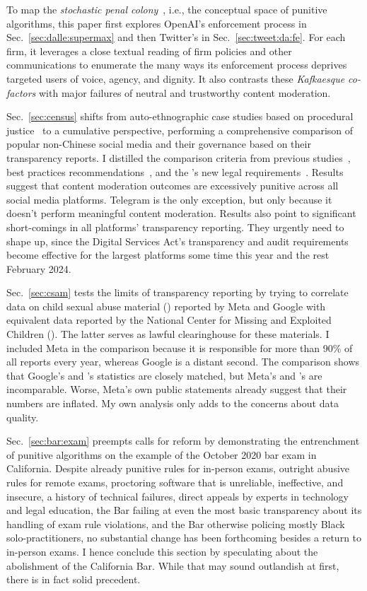 To map the \emph{stochastic penal colony}~, i.e., the
conceptual space of punitive algorithms, this paper first explores OpenAI's
enforcement process in Sec.\ \ref{sec:dalle:supermax} and then Twitter's in
Sec.\ \ref{sec:tweet:da:fe}. For each firm, it leverages a close textual reading
of firm policies and other communications to enumerate the many ways its
enforcement process deprives targeted users of voice, agency, and dignity. It
also contrasts these \emph{Kafkaesque co-factors} with major failures of neutral
and trustworthy content moderation.

Sec.\ \ref{sec:census} shifts from auto-ethnographic case studies based on
procedural justice~\cite{Tyler2003,Tyler2006,Tyler2007} to a cumulative
perspective, performing a comprehensive comparison of popular non-Chinese social
media and their governance based on their transparency reports. I distilled the
comparison criteria from previous
studies~\cite{BradfordGriselea2019,CrockerGebhartea2019}, best practices
recommendations~\cite{TheSantaClaraPrinciples2021}, and the \EU's new legal
requirements~\cite{EuropeanParliamentAndCouncil2022}. Results suggest that
content moderation outcomes are excessively punitive across all social media
platforms. Telegram is the only exception, but only because it doesn't perform
meaningful content moderation. Results also point to significant short-comings
in all platforms' transparency reporting. They urgently need to shape up, since
the Digital Services Act's transparency and audit requirements become effective
for the largest platforms some time this year and the rest February 2024.

Sec.\ \ref{sec:csam} tests the limits of transparency reporting by trying to
correlate data on child sexual abuse material (\CSAM) reported by Meta and
Google with equivalent data reported by the National Center for Missing and
Exploited Children (\NCMEC). The latter serves as lawful clearinghouse for these
materials. I included Meta in the comparison because it is responsible for more
than 90\% of all \CSAM{} reports every year, whereas Google is a distant second.
The comparison shows that Google's and \NCMEC's statistics are closely matched,
but Meta's and \NCMEC's are incomparable. Worse, Meta's own public statements
already suggest that their numbers are inflated. My own analysis only adds to
the concerns about data quality.

Sec.\ \ref{sec:bar:exam} preempts calls for reform by demonstrating the
entrenchment of punitive algorithms on the example of the October 2020 bar exam
in California. Despite already punitive rules for in-person exams, outright
abusive rules for remote exams, proctoring software that is unreliable,
ineffective, and insecure, a history of technical failures, direct appeals by
experts in technology and legal education, the Bar failing at even the most
basic transparency about its handling of exam rule violations, and the Bar
otherwise policing mostly Black solo-practitioners, no substantial change has
been forthcoming besides a return to in-person exams. I hence conclude this
section by speculating about the abolishment of the California Bar. While that
may sound outlandish at first, there is in fact solid precedent.

